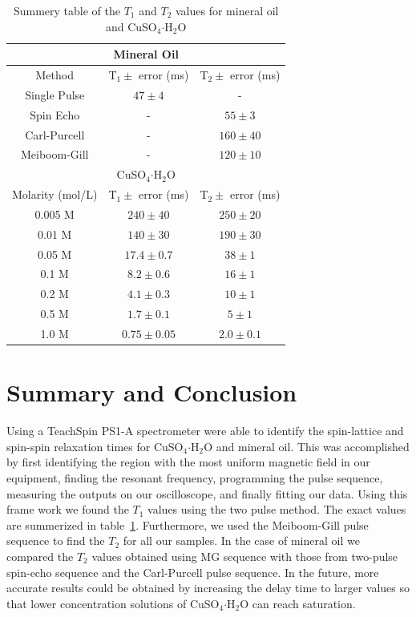 \documentclass[
reprint,
amsmath,amssymb,
aps,
tikz,
border=5pt
]{revtex4-1}
\newcommand*{\cuso}[1][]{CuSO$_{4} \boldsymbol{\cdot} $H$_2$O }
\newcommand*{\tc}[1][1]{$T_#1$ }
\newcommand*{\tg}[1][2]{$T_#1$ }
\begin{document}
    \begin{table}[h]
    \begin{center}
    \begin{tabular}[b]{ |c|c|c| }
        \hline
        \multicolumn{3}{|c|}{Mineral Oil} \\ \hline
        Method & T$_1\pm$ error (ms) & T$_2\pm$ error (ms) \\ \hline
        Single Pulse & $47\pm 4$ & - \\ \hline 
        Spin Echo & - & $55\pm 3$ \\ \hline
        Carl-Purcell & - & $160\pm 40$ \\ \hline 
        Meiboom-Gill & - & $120\pm 10$ \\ \hline
        \multicolumn{3}{|c|}{CuSO$_{4} \boldsymbol{\cdot} $H$_2$O} \\ \hline
        Molarity (mol/L) & T$_1\pm$ error (ms) & T$_2\pm$ error (ms) \\ \hline
        0.005 M & $240\pm 40 $ & $250 \pm 20$ \\ \hline 
        0.01 M & $140 \pm 30$ & $190 \pm 30$ \\ \hline
        0.05 M & $17.4 \pm 0.7 $ & $ 38 \pm 1$ \\ \hline 
        0.1 M & $8.2 \pm 0.6$ & $16 \pm 1$ \\ \hline
        0.2 M & $4.1 \pm 0.3$ & $10 \pm 1$ \\ \hline 
        0.5 M & $1.7 \pm 0.1$ & $5 \pm 1$ \\ \hline
        1.0 M & $0.75 \pm 0.05$ & $2.0 \pm 0.1$ \\ \hline 
    \end{tabular}
        
        \caption{Summery table of the $T_1$ and $T_2$ values for mineral oil and \cuso}
        \label{tab:summery}
    \end{center}
    \end{table}
  

\section*{Summary \lowercase{and} Conclusion}


    Using a TeachSpin PS1-A spectrometer were able to identify the spin-lattice and spin-spin relaxation times for \cuso and mineral oil. This was accomplished by first identifying the region with the most uniform magnetic field in our equipment, finding the resonant frequency, programming the pulse sequence, measuring the outputs on our oscilloscope, and finally fitting our data. Using this frame work we found the \tc values using the two pulse method. The exact values are summerized in table~\ref{tab:summery}. Furthermore, we used the Meiboom-Gill pulse sequence to find the \tg for all our samples. In the case of mineral oil we compared the \tg values obtained using MG sequence with those from two-pulse spin-echo sequence and the Carl-Purcell pulse sequence. In the future, more accurate results could be  obtained by increasing the delay time to larger values so that lower concentration solutions of \cuso can reach saturation.
\end{document}
